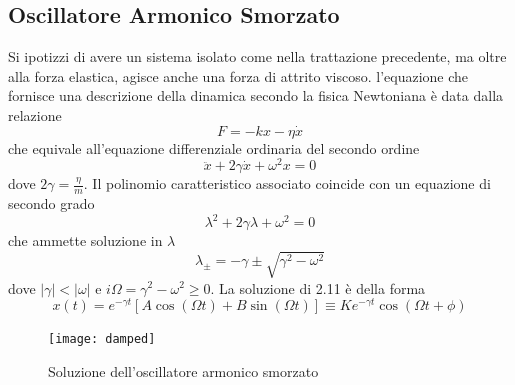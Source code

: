 \subsection{Oscillatore Armonico Smorzato}

Si ipotizzi di avere un sistema isolato come nella trattazione precedente, ma oltre alla forza elastica, agisce anche una forza di attrito viscoso. l'equazione che fornisce una descrizione della dinamica secondo la fisica Newtoniana \`{e} data dalla relazione
\begin{equation*}
	F = -kx - \eta \dot{x}
\end{equation*}
che equivale all'equazione differenziale ordinaria del secondo ordine 
\begin{equation}
	\ddot{x} + 2\gamma\dot{x} + \omega^2x = 0 
\end{equation}
dove $2\gamma = \frac{\eta}{m}$. Il polinomio caratteristico associato coincide con un equazione di secondo grado 
\begin{equation*}
	\lambda^2 + 2 \gamma \lambda + \omega^2 = 0
\end{equation*}
che ammette soluzione in $\lambda$
\begin{equation*}
	\lambda_{\pm} = -\gamma \pm \sqrt{\gamma^2-\omega^2}
\end{equation*}
dove $|\gamma| < |\omega|$ e $i \Omega = \gamma^2 - \omega^2 \geq 0$. La soluzione di 2.11 \`{e} della forma 
\begin{equation}
	x(t) = e^{-\gamma t} \left [ A \cos (\Omega t) + B \sin (\Omega t) \right ] \equiv Ke^{-\gamma t}\cos(\Omega t + \phi) 
\end{equation} 

 
\begin{figure}[ht]
\vspace{0.1in}
\texttt{[image: damped]}	
\centering
\vspace{0.2in}
\caption{Soluzione dell'oscillatore armonico smorzato}
\end{figure}


